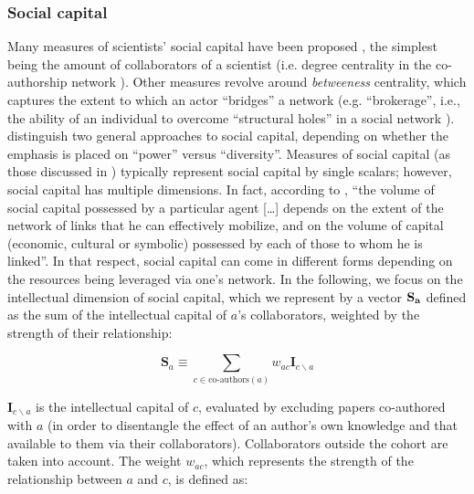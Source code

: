 \documentclass{article}
\begin{document}
\subsubsection{Social capital}

Many measures of scientists' social capital have been proposed \citep{Abbasi2014,Schirone2023}, the simplest being the amount of collaborators of a scientist (i.e. degree centrality in the co-authorship network \citealt{Roth2010}). Other measures revolve around \textit{betweeness} centrality, which captures the extent to which an actor ``bridges'' a network (e.g. ``brokerage'', i.e., the ability of an individual to overcome ``structural holes'' in a social network \citep{BurtBrokerage2007}). \citet{Abbasi2014} distinguish two general approaches to social capital, depending on whether the emphasis is placed on ``power'' versus ``diversity''. Measures of social capital (as those discussed in \citealt{Abbasi2014}) typically represent social capital by single scalars; however, social capital has multiple dimensions. In fact, according to \citet{Bourdieu1980}, ``the volume of social capital possessed by a particular agent [\dots] depends on the extent of the network of links that he can effectively mobilize, and on the volume of capital (economic, cultural or symbolic) possessed by each of those to whom he is linked''. In that respect, social capital can come in different forms depending on the resources being leveraged via one's network. %
In the following, we focus on the intellectual dimension of social capital, which we represent by a vector $\bf{S}_{a}$  %
defined as the sum of the intellectual capital of $a$'s collaborators, weighted by the strength of their relationship:

\begin{equation}
    \bm{S}_{a} \equiv \sum_{c \in \text{co-authors}(a)} w_{ac} \bm{I}_{c\backslash a}
\end{equation}

$\bm{I}_{c\backslash a}$ is the intellectual capital of $c$, evaluated by excluding papers co-authored with $a$ (in order to disentangle the effect of an author's own knowledge and that available to them via their collaborators). Collaborators outside the cohort are taken into account. The weight $w_{ac}$, which represents the strength of the relationship between $a$ and $c$, is defined as:
\end{document}
